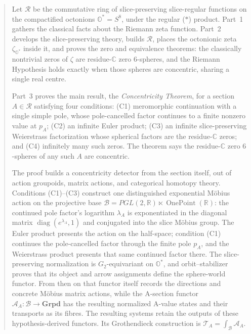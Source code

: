 \documentclass[11pt]{article}
\newcommand{\OO}{\mathbb{O}}
\newcommand{\CC}{\mathbb{C}}
\newcommand{\RR}{\mathbb{R}}
\newcommand{\Ostar}{\OO^{*}}
\newcommand{\zetaO}{\zeta_{\Ostar}}
\theoremstyle{plain}
\theoremstyle{definition}
\theoremstyle{remark}
\begin{document}
\begin{abstract}
Let $\mathcal R$ be the commutative ring of slice-preserving slice-regular functions on the
compactified octonions $\OO^{*}=S^8$, under the regular ($\ast$) product. Part~1 gathers the
classical facts about the Riemann zeta function. Part~2 develops the slice-preserving theory,
builds $\mathcal R$, places the octonionic zeta $\zetaO$ inside it, and proves the zero and
equivalence theorems: the classically nontrivial zeros of $\zeta$ are residue-$\CC$ zero
$6$-spheres, and the Riemann Hypothesis holds exactly when those spheres are concentric, sharing
a single real centre.

Part~3 proves the main result, the \emph{Concentricity Theorem}, for a section $A\in\mathcal R$
satisfying four conditions: \textup{(C1)} meromorphic continuation with a single simple pole,
whose pole-cancelled factor continues to a finite nonzero value at $p_A$;
\textup{(C2)} an infinite Euler product; \textup{(C3)} an infinite
slice-preserving Weierstrass factorization whose spherical factors are the residue-$\CC$ zeros; and
\textup{(C4)} infinitely many such zeros. The theorem says the residue-$\CC$ zero $6$-spheres of
any such $A$ are concentric.

The proof builds a concentricity detector from the section itself, out of action groupoids,
matrix actions, and categorical homotopy theory. Conditions \textup{(C1)--(C3)} construct one
distinguished exponential M\"obius action on the projective base
$\mathcal B=PGL(2,\RR)\ltimes\operatorname{OnePoint}(\RR)$: the continued pole factor's
logarithm $\lambda_A$ is exponentiated in the diagonal matrix
$\operatorname{diag}(e^{\lambda_A},1)$ and conjugated into the slice M\"obius group. The
Euler product presents the action on the half-space; condition \textup{(C1)} continues the
pole-cancelled factor through the finite pole $p_A$, and the Weierstrass product presents that
same continued factor there. The slice-preserving normalization is $G_2$-equivariant on $\Ostar$, and
orbit--stabilizer proves that its object and arrow assignments define the sphere-world functor.
From then on that functor itself records the directions and concrete M\"obius matrix actions, while the A-section functor
$\mathcal A_A:\mathcal B\to\mathbf{Grpd}$ has the resulting normalized A-value states and their
transports as its fibres. The resulting systems retain the outputs of
these hypothesis-derived functors. Its Grothendieck construction is
$\mathcal T_A=\int_{\mathcal B}\mathcal A_A$.


\end{abstract}
\end{document}
